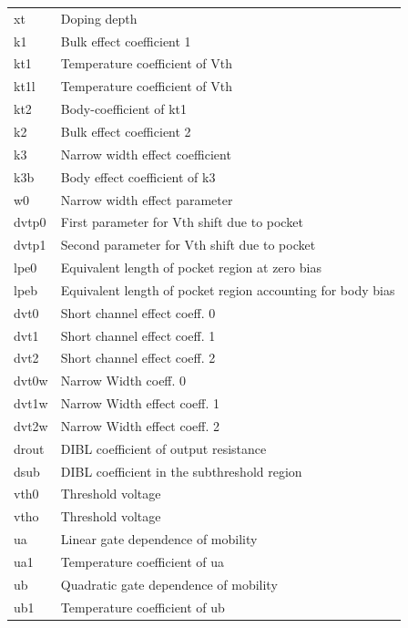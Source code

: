 \begin{longtable}{l l}
{\small xt} & {\small Doping depth} \\
{\small k1} & {\small Bulk effect coefficient 1} \\
{\small kt1} & {\small Temperature coefficient of Vth} \\
{\small kt1l} & {\small Temperature coefficient of Vth} \\
{\small kt2} & {\small Body-coefficient of kt1} \\
{\small k2} & {\small Bulk effect coefficient 2} \\
{\small k3} & {\small Narrow width effect coefficient} \\
{\small k3b} & {\small Body effect coefficient of k3} \\
{\small w0} & {\small Narrow width effect parameter} \\
{\small dvtp0} & {\small First parameter for Vth shift due to pocket} \\
{\small dvtp1} & {\small Second parameter for Vth shift due to pocket} \\
{\small lpe0} & {\small Equivalent length of pocket region at zero bias} \\
{\small lpeb} & {\small Equivalent length of pocket region accounting for body bias} \\
{\small dvt0} & {\small Short channel effect coeff. 0} \\
{\small dvt1} & {\small Short channel effect coeff. 1} \\
{\small dvt2} & {\small Short channel effect coeff. 2} \\
{\small dvt0w} & {\small Narrow Width coeff. 0} \\
{\small dvt1w} & {\small Narrow Width effect coeff. 1} \\
{\small dvt2w} & {\small Narrow Width effect coeff. 2} \\
{\small drout} & {\small DIBL coefficient of output resistance} \\
{\small dsub} & {\small DIBL coefficient in the subthreshold region} \\
{\small vth0} & {\small Threshold voltage} \\
{\small vtho} & {\small Threshold voltage} \\
{\small ua} & {\small Linear gate dependence of mobility} \\
{\small ua1} & {\small Temperature coefficient of ua} \\
{\small ub} & {\small Quadratic gate dependence of mobility} \\
{\small ub1} & {\small Temperature coefficient of ub} \\

\end{longtable}

